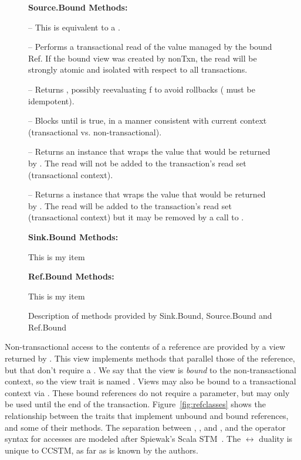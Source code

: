\begin{figure}
\textbf{Source.Bound Methods:}
\begin{packed_itemize}
\item {} -- This is equivalent to a .
\item {} -- Performs a transactional read of the value 
managed by the bound Ref. If the bound view was created by nonTxn, the read will
be strongly atomic and isolated with respect to all transactions.
\item {} -- Returns , possibly 
reevaluating f to avoid rollbacks ( must be idempotent).
\item {} -- Blocks until  is true, in a 
manner consistent with current context (transactional vs. non-transactional).
\item {} -- Returns an  instance that 
wraps the value that would be returned by . The read will not be added to the transaction's read set (transactional context).
\item {} -- Returns a  instance that 
wraps the value that would be returned by . The read will be added to the transaction's read set (transactional context) but it may be removed by a call to 
.
\end{packed_itemize}

\textbf{Sink.Bound Methods:}

\begin{packed_itemize}
\item{This is my item}
\end{packed_itemize}

\textbf{Ref.Bound Methods:}

\begin{packed_itemize}
\item{This is my item}
\end{packed_itemize}

\caption{Description of methods provided by Sink.Bound, Source.Bound and Ref.Bound }
\end{figure}

Non-transactional access to the contents of a reference are provided by a view
returned by .  This view implements methods that parallel those of
the reference, but that don't require a .  We say that the view
is \textit{bound} to the non-transactional context, so the view trait is
named .  Views may also be bound to a transactional context
via .  These bound references do not require a 
parameter, but may only be used until the end of the transaction.
Figure~\ref{fig:refclasses} shows the
 relationship between the traits that implement unbound
and bound references, and some of their methods.  The separation between
, , and , and the operator syntax for
accesses are modeled after Spiewak's Scala STM~\cite{github:spiewak}.
The  $ \leftrightarrow $  duality is unique
to CCSTM, as far as is known by the authors.

